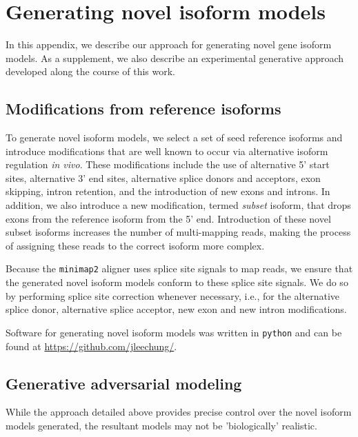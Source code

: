 
\chapter{Generating novel isoform models}\label{ap:gen-novl-iso}

In this appendix, we describe our approach for generating novel gene isoform models. As a supplement, we also describe an experimental generative approach developed along the course of this work.   

\section{Modifications from reference isoforms}

To generate novel isoform models, we select a set of seed reference isoforms and introduce modifications that are well known to occur via alternative isoform regulation \textit{in vivo}. These modifications include the use of alternative 5' start sites, alternative 3' end sites, alternative splice donors and acceptors, exon skipping, intron retention, and the introduction of new exons and introns. In addition, we also introduce a new modification, termed \textit{subset} isoform, that drops exons from the reference isoform from the 5' end. Introduction of these novel subset isoforms increases the number of multi-mapping reads, making the process of assigning these reads to the correct isoform more complex. 


Because the \texttt{minimap2} aligner uses splice site signals to map reads, we ensure that the generated novel isoform models conform to these splice site signals. We do so by performing splice site correction whenever necessary, i.e., for the alternative splice donor, alternative splice acceptor, new exon and new intron modifications. 


Software for generating novel isoform models was written in \texttt{python} and can be found at \url{https://github.com/jleechung/}.

\section{Generative adversarial modeling}

While the approach detailed above provides precise control over the novel isoform models generated, the resultant models may not be 'biologically' realistic.  

